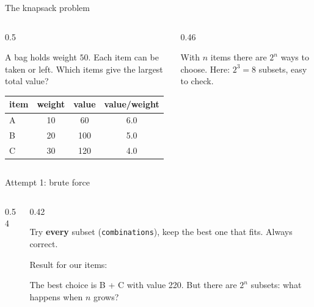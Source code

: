 \documentclass[aspectratio=169,10pt]{beamer}
\begin{document}
\begin{frame}{The knapsack problem}
\begin{columns}[T]
\begin{column}{0.5\textwidth}
\vspace{2mm}
{\small
A bag holds weight $50$. Each item can be taken or left. Which items give the largest total value?

\vspace{2mm}
\footnotesize\setlength\tabcolsep{3pt}\begin{tabular}{@{}lccc@{}}\toprule item & weight & value & value/weight\\\midrule A & 10 & 60 & 6.0\\ B & 20 & 100 & 5.0\\ C & 30 & 120 & 4.0\\\bottomrule\end{tabular}}
\end{column}
\begin{column}{0.46\textwidth}
\begin{sfig}[0.7]
\end{sfig}
{\small
With $n$ items there are $2^n$ ways to choose. Here: $2^3=8$ subsets, easy to check.}
\end{column}
\end{columns}
\end{frame}

\begin{frame}{Attempt 1: brute force}
\begin{columns}[T]
\begin{column}{0.54\textwidth}
\end{column}
\begin{column}{0.42\textwidth}
{\small
Try \textbf{every} subset (\texttt{combinations}), keep the best one that fits. Always correct.

\vspace{2mm}
Result for our items:}
{\small
\vspace{2mm}
The best choice is B + C with value 220. But there are $2^n$ subsets: what happens when $n$ grows?}
\end{column}
\end{columns}
\end{frame}
\end{document}
